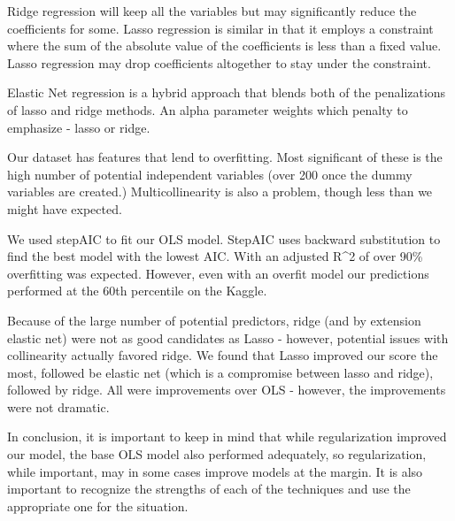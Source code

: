\documentclass[
]{article}
\begin{document}
Ridge regression will keep all the variables but may significantly
reduce the coefficients for some. Lasso regression is similar in that it
employs a constraint where the sum of the absolute value of the
coefficients is less than a fixed value. Lasso regression may drop
coefficients altogether to stay under the constraint.

Elastic Net regression is a hybrid approach that blends both of the
penalizations of lasso and ridge methods. An alpha parameter weights
which penalty to emphasize - lasso or ridge.

Our dataset has features that lend to overfitting. Most significant of
these is the high number of potential independent variables (over 200
once the dummy variables are created.) Multicollinearity is also a
problem, though less than we might have expected.

We used stepAIC to fit our OLS model. StepAIC uses backward substitution
to find the best model with the lowest AIC. With an adjusted R\^{}2 of
over 90\% overfitting was expected. However, even with an overfit model
our predictions performed at the 60th percentile on the Kaggle.

Because of the large number of potential predictors, ridge (and by
extension elastic net) were not as good candidates as Lasso - however,
potential issues with collinearity actually favored ridge. We found that
Lasso improved our score the most, followed be elastic net (which is a
compromise between lasso and ridge), followed by ridge. All were
improvements over OLS - however, the improvements were not dramatic.

In conclusion, it is important to keep in mind that while regularization
improved our model, the base OLS model also performed adequately, so
regularization, while important, may in some cases improve models at the
margin. It is also important to recognize the strengths of each of the
techniques and use the appropriate one for the situation.
\end{document}
